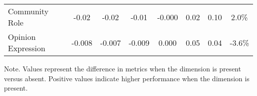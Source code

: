\begin{table}
\begin{tabular}{lccccccc}
Community Role & -0.02 & -0.02 & -0.01 & -0.000 & 0.02 & 0.10 & 2.0\% \\
Opinion Expression & -0.008 & -0.007 & -0.009 & 0.000 & 0.05 & 0.04 & -3.6\% \\
\hline
\end{tabular}
\begin{tablenotes}
\small
\item Note. Values represent the difference in metrics when the dimension is present versus absent. Positive values indicate higher performance when the dimension is present.
\end{tablenotes}
\end{table}